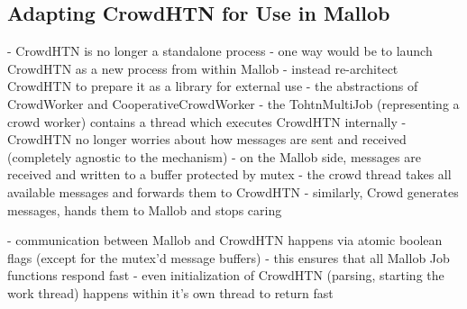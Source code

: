 \subsection{Adapting CrowdHTN for Use in Mallob}
- CrowdHTN is no longer a standalone process
- one way would be to launch CrowdHTN as a new process from within Mallob
- instead re-architect CrowdHTN to prepare it as a library for external use
- the abstractions of CrowdWorker  and CooperativeCrowdWorker
- the TohtnMultiJob (representing a crowd worker) contains a thread which executes CrowdHTN internally
- CrowdHTN no longer worries about how messages are sent and received (completely agnostic to the mechanism)
- on the Mallob side, messages are received and written to a buffer protected by mutex
- the crowd thread takes all available messages and forwards them to CrowdHTN
- similarly, Crowd generates messages, hands them to Mallob and stops caring

- communication between Mallob and CrowdHTN happens via atomic boolean flags (except for the mutex'd message buffers)
- this ensures that all Mallob Job functions respond fast
- even initialization of CrowdHTN (parsing, starting the work thread) happens within it's own thread to return fast
